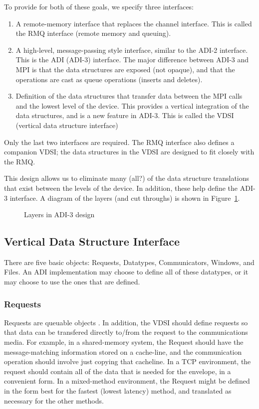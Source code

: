\documentclass{article}
\let\note=\marginpar
\begin{document}
To provide for both of these goals, we specify three interfaces:
\begin{enumerate}
\item A remote-memory interface that replaces the channel interface. This is
  called the RMQ interface (remote memory and queuing).
\item A high-level, message-passing style interface, similar to the ADI-2
  interface.  This is the ADI (ADI-3) interface.  The major difference between
  ADI-3 and MPI is that the data structures are exposed (not opaque), and that
  the operations are cast as queue operations (inserts and deletes).
\item Definition of the data structures that transfer data between the MPI
  calls and the lowest level of the device.  This provides a vertical
  integration of the data structures, and is a new feature in ADI-3.  This is
  called the VDSI (vertical data structure interface)
\end{enumerate}
Only the last two interfaces are required.  The RMQ interface also defines a
companion VDSI; the data structures in the VDSI are designed to fit closely
with the RMQ.

This design allows us to eliminate many (all?) of the data structure
translations 
that exist between the levels of the device.  In addition, these help define
the ADI-3 interface.  A diagram of the layers (and cut throughs) is shown in
Figure~\ref{fig:layers}.

\begin{figure}
\centerline{}
\caption{Layers in ADI-3 design}
\label{fig:layers}
\end{figure}

\subsection{Vertical Data Structure Interface}
There are five basic objects: Requests, Datatypes, Communicators, Windows, and
Files.  An ADI implementation may choose to define all of these datatypes, or
it may choose to use the ones that are defined.  

\subsubsection{Requests}
Requests are queuable objects \note{should everything be queueable?}.  In
addition, the VDSI should define requests so that data can be transfered
directly to/from the request to the communications media.  For example, in a
shared-memory system, the Request should have the message-matching information
stored on a cache-line, and the communication operation should involve just
copying that cacheline.  In a TCP environment, the request should contain all
of the data that is needed for the envelope, in a convenient form.  In a
mixed-method environment, the Request might be defined in the form best for
the fastest (lowest latency) method, and translated as necessary for the other
methods.  
\end{document}

